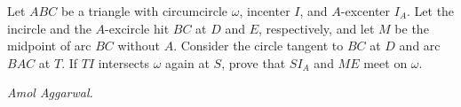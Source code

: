 Let $ABC$ be a triangle with circumcircle $\omega$, incenter $I$, and $A$-excenter $I_A$. Let the incircle and the $A$-excircle hit $BC$ at $D$ and $E$, respectively, and let $M$ be the midpoint of arc $BC$ without $A$. Consider the circle tangent to $BC$ at $D$ and arc $BAC$ at $T$. If $TI$ intersects $\omega$ again at $S$, prove that $SI_A$ and $ME$ meet on $\omega$.

\textit{Amol Aggarwal.}